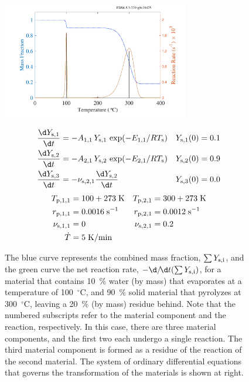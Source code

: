\documentclass[11pt]{book}
\begin{document}
\begin{figure}[ht]
\noindent
\begin{minipage}{0.5\textwidth}
\includegraphics[width=3.2in]{SCRIPT_FIGURES/pyrolysis_2}
\end{minipage}
\hfill
\begin{minipage}{0.5\textwidth}
\footnotesize
\begin{align*}
   \frac{\d Y_{\rm s,1}}{\d t} &= -A_{1,1} \, Y_{\rm s,1} \, \exp(-E_{1,1}/RT_{\rm s})                  & Y_{\rm s,1}(0) &=0.1 \\
   \frac{\d Y_{\rm s,2}}{\d t} &= -A_{2,1} \, Y_{\rm s,2} \, \exp(-E_{2,1}/RT_{\rm s})                  & Y_{\rm s,2}(0) &=0.9 \\
   \frac{\d Y_{\rm s,3}}{\d t} &= -\nu_{{\rm s},2,1} \frac{\d Y_{\rm s,2}}{\d t}                        & Y_{\rm s,3}(0) &=0.0
\end{align*}
\begin{align*}
   T_{{\rm p},1,1} &= 100+273 \; \mathrm{K}        & T_{{\rm p},2,1}   &= 300+273 \; \mathrm{K} \\
   r_{{\rm p},1,1} &= 0.0016 \; \mathrm{s}^{-1}           & r_{{\rm p},2,1}   &= 0.0012 \; \mathrm{s}^{-1} \\
   \nu_{{\rm s},1,1} &= 0                          & \nu_{{\rm s},2,1} &= 0.2 \\
   \dot{T} &= 5 \; \mathrm{K/min} & &
\end{align*}
\end{minipage} \normalsize
\caption[A more complicated demonstration of the pyrolysis model]{The blue curve represents the combined mass fraction, $\sum Y_{\rm s,i}$, and the green curve the net reaction rate, $-\d/\!\d t(\sum Y_{\rm s,i})$, for a material that contains 10~\% water (by mass) that evaporates at a temperature of 100~$^\circ$C, and 90~\% solid material that pyrolyzes at 300~$^\circ$C, leaving a 20~\% (by mass) residue behind. Note that the numbered subscripts refer to the material component and the reaction, respectively. In this case, there are three material components, and the first two each undergo a single reaction. The third material component is formed as a residue of the reaction of the second material.
The system of ordinary differential equations that governs the transformation of the materials is shown at right.}
\label{pyrolysis_2}
\end{figure}
\end{document}
